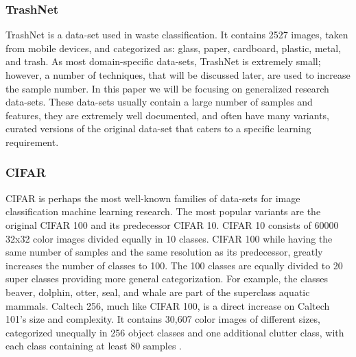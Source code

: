 \documentclass[10pt,twocolumn,letterpaper]{article}
\begin{document}
\subsubsection{TrashNet}
 TrashNet \cite{karthikeyan_review_2022} is a data-set used in waste classification. It contains 2527 images, taken from mobile devices, and categorized as:  glass, paper, cardboard, plastic, metal, and trash. As most domain-specific data-sets, TrashNet is extremely small; however, a number of techniques, that will be discussed later, are used to increase the sample number. In this paper we will be focusing on generalized research data-sets. These data-sets usually contain a large number of samples and features, they are extremely well documented, and often have many variants, curated versions of the original data-set that caters to a specific learning requirement. 

\subsubsection{CIFAR}
CIFAR \cite{iba_deep_2020} \cite{sankar_regularizing_2017} \cite{wang_residual_2017} is perhaps the most well-known families of data-sets for image classification machine learning research. The most popular variants are the original CIFAR 100 and its predecessor CIFAR 10. CIFAR 10 \cite{noauthor_cifar-10_nodate} consists of 60000 32x32 color images divided equally in 10 classes. CIFAR 100 \cite{noauthor_cifar-100_nodate} while having the same number of samples and the same resolution as its predecessor, greatly increases the number of classes to 100. The 100 classes are equally divided to 20 super classes providing more general categorization. For example, the classes beaver, dolphin, otter, seal, and whale are part of the superclass aquatic mammals. Caltech 256, much like CIFAR 100, is a direct increase on Caltech 101’s size and complexity. It contains 30,607 color images of different sizes, categorized unequally in 256 object classes and one additional clutter class, with each class containing at least 80 samples \cite{noauthor_caltech_nodate}. 
\end{document}

